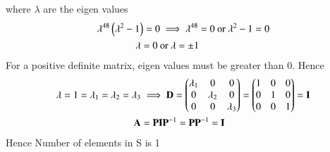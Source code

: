 \documentclass[journal]{IEEEtran}
\begin{document}
where $\lambda$ are the eigen values
\begin{align}
    \lambda^{48}\left(\lambda^2-1\right)=0&\implies
    \lambda^{48}=0\ \text{or}\ \lambda^{2}-1=0 \\
     \lambda=0\ &\text{or}\ \lambda=\pm1
\end{align}
For a positive definite matrix, eigen values must be greater than 0. Hence
\begin{align}
    \lambda=1=\lambda_1=\lambda_2=\lambda_3 &\implies \mathbf{D}=\begin{pmatrix}\lambda_1&0&0\\0&\lambda_2&0\\0&0&\lambda_3\end{pmatrix}=\begin{pmatrix}1&0&0\\0&1&0\\0&0&1\end{pmatrix}=\mathbf{I}\\
    \mathbf{A}&=\mathbf{P}\mathbf{I}\mathbf{P}^{-1}
    =\mathbf{P}\mathbf{P}^{-1}=\mathbf{I}
\end{align}
Hence Number of elements in S is 1
\end{document}
